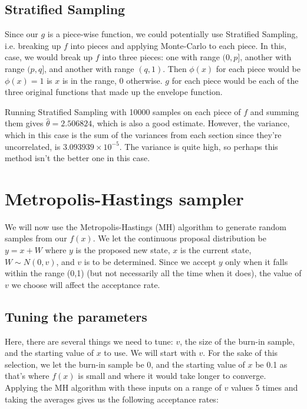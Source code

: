 \documentclass[11pt, a4paper]{article}
\begin{document}
\subsection{Stratified Sampling}
Since our $g$ is a piece-wise function, we could potentially use Stratified Sampling, i.e. breaking up $f$ into pieces and applying Monte-Carlo to each piece. In this, case, we would break up $f$ into three pieces: one with range $(0,p]$, another with range $(p,q]$, and another with range $(q,1)$. Then $\phi(x)$ for each piece would be $\phi(x)=1$ is $x$ is in the range, 0 otherwise. $g$ for each piece would be each of the three original functions that made up the envelope function.

Running Stratified Sampling with 10000 samples on each piece of $f$ and summing them gives $\hat{\theta} = 2.506824$, which is also a good estimate. However, the variance, which in this case is the sum of the variances from each section since they're uncorrelated, is $3.093939 \times 10^{-5}$. The variance is quite high, so perhaps this method isn't the better one in this case. 

\section{Metropolis-Hastings sampler}

We will now use the Metropolis-Hastings (MH) algorithm to generate random samples from our $f(x)$. We let the continuous proposal distribution be $y = x + W$ where $y$ is the proposed new state, $x$ is the current state, $W \sim N(0,v)$, and $v$ is to be determined. Since we accept $y$ only when it falls within the range (0,1) (but not necessarily all the time when it does), the value of $v$ we choose will affect the acceptance rate.

\subsection{Tuning the parameters}

Here, there are several things we need to tune: $v$, the size of the burn-in sample, and the starting value of $x$ to use. We will start with $v$. For the sake of this selection, we let the burn-in sample be 0, and the starting value of $x$ be 0.1 as that's where $f(x)$ is small and where it would take longer to converge. Applying the MH algorithm with these inputs on a range of $v$ values 5 times and taking the averages gives us the following acceptance rates:
\end{document}
